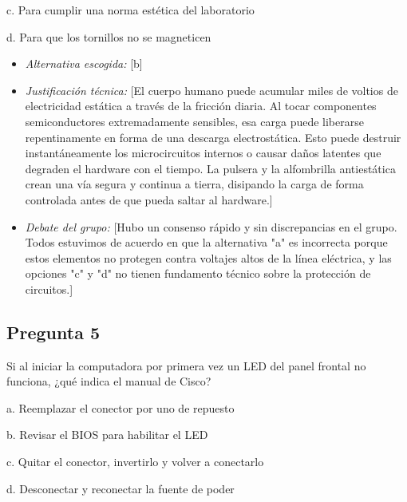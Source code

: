 \documentclass{article}
\begin{document}
c. Para cumplir una norma estética del laboratorio

d. Para que los tornillos no se magneticen

\begin{itemize}
\item \emph{Alternativa escogida:} [b]

\item \emph{Justificación técnica:} [El cuerpo humano puede acumular miles de
voltios de electricidad estática a través de la fricción diaria. Al
tocar componentes semiconductores extremadamente sensibles, esa
carga puede liberarse repentinamente en forma de una descarga
electrostática. Esto puede destruir instantáneamente los
microcircuitos internos o causar daños latentes que degraden el
hardware con el tiempo. La pulsera y la alfombrilla antiestática
crean una vía segura y continua a tierra, disipando la carga de
forma controlada antes de que pueda saltar al hardware.]

\item \emph{Debate del grupo:} [Hubo un consenso rápido y sin discrepancias en
el grupo. Todos estuvimos de acuerdo en que la alternativa "a" es
incorrecta porque estos elementos no protegen contra voltajes altos
de la línea eléctrica, y las opciones "c" y "d" no tienen fundamento técnico
sobre la protección de circuitos.]
\end{itemize}

\subsection{Pregunta 5}
\label{sec:orgdc1aee0}
Si al iniciar la computadora por primera vez un LED del panel frontal no funciona, ¿qué indica el manual de Cisco?

a. Reemplazar el conector por uno de repuesto

b. Revisar el BIOS para habilitar el LED

c. Quitar el conector, invertirlo y volver a conectarlo

d. Desconectar y reconectar la fuente de poder
\end{document}
